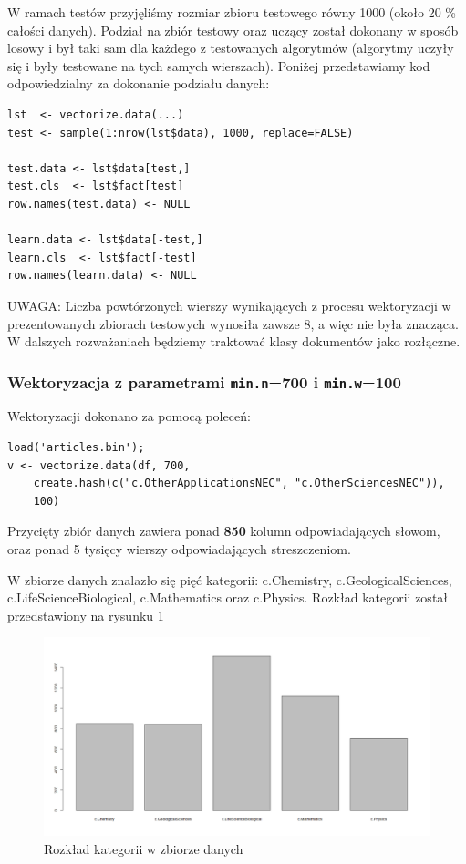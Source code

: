 \documentclass[a4paper,12pt]{article}
\begin{document}
		W ramach testów przyjęliśmy rozmiar zbioru testowego równy 1000
		(około 20 \% całości danych).
		Podział na zbiór testowy oraz uczący został dokonany w sposób
		losowy i był taki sam dla każdego z testowanych algorytmów
		(algorytmy uczyły się i były testowane na tych samych wierszach).
		Poniżej przedstawiamy kod odpowiedzialny za dokonanie 
		podziału danych:
		\begin{verbatim}
lst  <- vectorize.data(...)
test <- sample(1:nrow(lst$data), 1000, replace=FALSE)

test.data <- lst$data[test,]
test.cls  <- lst$fact[test]
row.names(test.data) <- NULL

learn.data <- lst$data[-test,]
learn.cls  <- lst$fact[-test]
row.names(learn.data) <- NULL
		\end{verbatim}
		
		\textsc{UWAGA}: Liczba powtórzonych wierszy wynikających z procesu wektoryzacji
		w prezentowanych zbiorach testowych wynosiła zawsze 8, a więc nie była znacząca.
		W dalszych rozważaniach będziemy traktować klasy dokumentów jako rozłączne.
		
		\subsubsection{Wektoryzacja z parametrami \texttt{min.n}=700 i
		 \texttt{min.w}=100}
		 
		 Wektoryzacji dokonano za pomocą poleceń:
		 \begin{verbatim}
load('articles.bin');
v <- vectorize.data(df, 700, 
	create.hash(c("c.OtherApplicationsNEC", "c.OtherSciencesNEC")),
	100) 
		 \end{verbatim}
		 
		 Przycięty zbiór danych zawiera ponad \textbf{850} kolumn odpowiadających słowom,
		 oraz ponad 5 tysięcy wierszy odpowiadających streszczeniom.
		 
		 W zbiorze danych znalazło się pięć kategorii: c.Chemistry, 		 
		 c.GeologicalSciences, c.LifeScienceBiological, c.Mathematics
		 oraz c.Physics. Rozkład kategorii został przedstawiony na 
		 rysunku \ref{fig:v1hist}
		 \begin{figure}[!h]
		 	\centering
		 		\includegraphics[width=\textwidth]{./img/v1_cats}
		 	\caption{Rozkład kategorii w zbiorze danych}
		 	\label{fig:v1hist}
		 \end{figure}
		 
\end{document}
